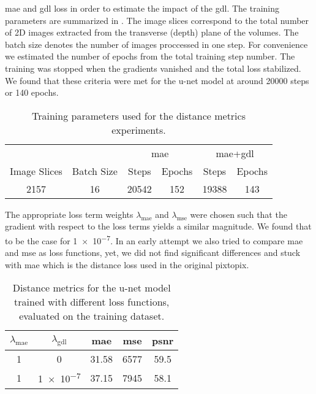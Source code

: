 \gls{mae} and \gls{gdl} loss in order to estimate the impact of the \gls{gdl}.
The training parameters are summarized in . The image
slices correspond to the total number of 2D images extracted from the
transverse (depth) plane of the volumes. The batch size denotes the number of
images proccessed in one step. For convenience we estimated the number of
epochs from the total training step number. The training was stopped when the
gradients vanished and the total loss stabilized. We found that these criteria
were met for the u-net model at around \num{20000} steps or \num{140} epochs.
\begin{table}[h]
  \centering
  \begin{tabular}{cccccc}
    \toprule
    & &
    \multicolumn{2}{c}{\acrshort{mae}} &
    \multicolumn{2}{c}{\acrshort{mae}+\acrshort{gdl}} \\
    Image Slices & Batch Size & Steps & Epochs & Steps & Epochs \\
    \midrule
    \num{2157} & \num{16} & \num{20542} & \num{152} & \num{19388} & \num{143} \\
    \bottomrule
  \end{tabular}
  \caption{Training parameters used for the distance metrics experiments.
  }\label{tab:unet:params}
\end{table}
The appropriate loss term weights $\lambda_\text{mae}$ and
$\lambda_\text{mse}$ were chosen such that the gradient with respect to the
loss terms yields a similar magnitude. We found that to be the case for
\num{1e-7}. In an early attempt we also tried to compare \gls{mae} and
\gls{mse} as loss functions, yet, we did not find significant differences and
stuck with \gls{mae} which is the distance loss used in the original pixtopix. 
\begin{table}[h]
  \centering
  \begin{tabular}{ccccc}
    \toprule
    $\lambda_\text{mae}$ &
    $\lambda_\text{gdl}$ &
    \acrshort{mae} &
    \acrshort{mse} &
    \acrshort{psnr} \\
    \midrule
    \num{1} & \num{0} & \num{31.58} & \num{6577} & \num{59.5} \\
    \num{1} & \num{1e-7} & \num{37.15} & \num{7945} & \num{58.1} \\
    \bottomrule
  \end{tabular}
  \caption{Distance metrics for the u-net model trained with different loss
    functions, evaluated on the training dataset.
  }\label{tab:unet:training}
\end{table}
